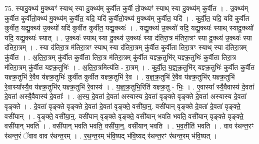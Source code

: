 \documentclass[17pt]{extarticle}
\begin{document}
75. स्यादु॒क्थ्य॑ मु॒क्थ्यꣳ॑ स्याथ् स्या दु॒क्थ्य॑म् कुर्वीत कुर्वी तो॒क्थ्यꣳ॑ स्याथ् स्या दु॒क्थ्य॑म् कुर्वीत । . उ॒क्थ्य॑म् कुर्वीत कुर्वीतो॒क्थ्य॑ मु॒क्थ्य॑म् कुर्वीत॒ यदि॒ यदि॑ कुर्वीतो॒क्थ्य॑ मु॒क्थ्य॑म् कुर्वीत॒ यदि॑ । . कु॒र्वी॒त॒ यदि॒ यदि॑ कुर्वीत कुर्वीत॒ यद्यु॒क्थ्य॑ उ॒क्थ्यो॑ यदि॑ कुर्वीत कुर्वीत॒ यद्यु॒क्थ्यः॑ । . यद्यु॒क्थ्य॑ उ॒क्थ्यो॑ यदि॒ यद्यु॒क्थ्यः॑ स्याथ् स्यादु॒क्थ्यो॑ यदि॒ यद्यु॒क्थ्यः॑ स्यात् । . उ॒क्थ्यः॑ स्याथ् स्या दु॒क्थ्य॑ उ॒क्थ्यः॑ स्या द॑तिरा॒त्र म॑तिरा॒त्रꣳ स्या दु॒क्थ्य॑ उ॒क्थ्यः॑ स्या द॑तिरा॒त्रम् । . स्या द॑तिरा॒त्र म॑तिरा॒त्रꣳ स्याथ् स्या द॑तिरा॒त्रम् कु॑र्वीत कुर्वीता तिरा॒त्रꣳ स्याथ् स्या द॑तिरा॒त्रम् कु॑र्वीत । . अ॒ति॒रा॒त्रम् कु॑र्वीत कुर्वीता तिरा॒त्र म॑तिरा॒त्रम् कु॑र्वीत यज्ञ्क्र॒तुभि॑र् यज्ञ्क्र॒तुभिः॑ कुर्वीता तिरा॒त्र म॑तिरा॒त्रम् कु॑र्वीत यज्ञ्क्र॒तुभिः॑ । . अ॒ति॒रा॒त्रमित्य॑ति - रा॒त्रम् । . कु॒र्वी॒त॒ य॒ज्ञ्॒क्र॒तुभि॑र् यज्ञ्क्र॒तुभिः॑ कुर्वीत कुर्वीत यज्ञ्क्र॒तुभि॑ रे॒वैव य॑ज्ञ्क्र॒तुभिः॑ कुर्वीत कुर्वीत यज्ञ्क्र॒तुभि॑ रे॒व । . य॒ज्ञ्॒क्र॒तुभि॑ रे॒वैव य॑ज्ञ्क्र॒तुभि॑र् यज्ञ्क्र॒तुभि॑ रे॒वास्या᳚स्यै॒व य॑ज्ञ्क्र॒तुभि॑र् यज्ञ्क्र॒तुभि॑ रे॒वास्य॑ । . य॒ज्ञ्॒क्र॒तुभि॒रिति॑ यज्ञ्क्र॒तु - भिः॒ । . ए॒वास्या᳚ स्यै॒वैवास्य॑ दे॒वता॑ दे॒वता॑ अस्यै॒वैवास्य॑ दे॒वताः᳚ । . अ॒स्य॒ दे॒वता॑ दे॒वता॑ अस्यास्य दे॒वता॑ वृङ्क्ते वृङ्क्ते दे॒वता॑ अस्यास्य दे॒वता॑ वृङ्क्ते । . दे॒वता॑ वृङ्क्ते वृङ्क्ते दे॒वता॑ दे॒वता॑ वृङ्क्ते॒ वसी॑या॒न्॒. वसी॑यान् वृङ्क्ते दे॒वता॑ दे॒वता॑ वृङ्क्ते॒ वसी॑यान् । . वृ॒ङ्क्ते॒ वसी॑या॒न्॒. वसी॑यान् वृङ्क्ते वृङ्क्ते॒ वसी॑यान् भवति भवति॒ वसी॑यान् वृङ्क्ते वृङ्क्ते॒ वसी॑यान् भवति । . वसी॑यान् भवति भवति॒ वसी॑या॒न्॒. वसी॑यान् भवति । . भ॒व॒तीति॑ भवति । . वाव र॑थन्त॒रꣳ र॑थन्त॒रं ॅवाव वाव र॑थन्त॒रम् । . र॒थ॒न्त॒रम् भ॑वि॒ष्यद् भ॑वि॒ष्यद् र॑थन्त॒रꣳ र॑थन्त॒रम् भ॑वि॒ष्यत् । \newline
\end{document}
